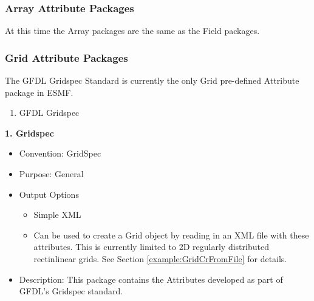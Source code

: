 \vspace{.20in}
\subsubsection{Array Attribute Packages}
\label{ArrayAttributePackages}

At this time the Array packages are the same as the Field packages.


\vspace{.20in}
\subsubsection{Grid Attribute Packages}
\label{GridAttributePackages}

The GFDL Gridspec Standard is currently the only Grid pre-defined Attribute package in ESMF.

\begin{enumerate}
    \item GFDL Gridspec
\end{enumerate}



\vspace{.20in}
{\bf 1. Gridspec}

\label{CIMFieldAttributePackages}

\begin{itemize}
    \item Convention: GridSpec
    \item Purpose: General
    \item Output Options
    \begin{itemize}
        \item Simple XML
        \item Can be used to create a Grid object by reading in an XML file with these attributes. This is currently limited to 2D regularly distributed rectinlinear grids. See Section \ref{example:GridCrFromFile} for details. 
    \end{itemize}
    \item Description: This package contains the Attributes developed as part of GFDL's Gridspec standard.
\end{itemize}

